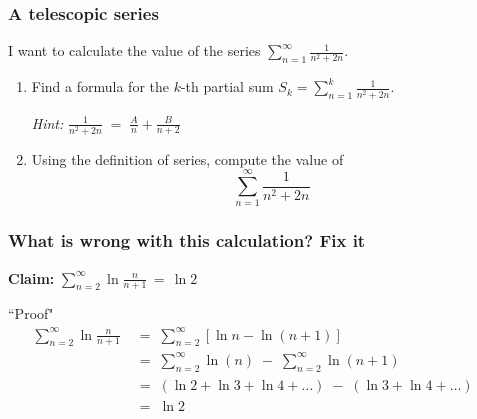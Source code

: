 \documentclass[14pt]{beamer}
\date{}
\title{}
\author{}
\begin{document}





	\begin{frame}[t]
		\fontsize{13}{13}\selectfont
		\frametitle{A telescopic series}
		I want to calculate the value of the series \;
		$\displaystyle \sum_{n=1}^{\infty}\frac{1}{n^{2}+2n}.$
		\vspace{.5cm}
		\begin{enumerate}
			\item Find a formula for the $k$-th partial sum $\displaystyle S_{k}= \sum_{n=1}
				^{k}\frac{1}{n^{2}+2n}.$

				\emph{Hint:} \; $\displaystyle \frac{1}{n^{2}+2n}\; = \; \frac{A}{n}+ \frac{B}{n+2}$
				\vspace{.5cm}

			\item Using the definition of series, compute the value of
				\[
					\sum_{n=1}^{\infty}\frac{1}{n^{2}+2n}
				\]
		\end{enumerate}
	\end{frame}

	\begin{frame}[t]
		\fontsize{13}{13}\selectfont
		\frametitle{What is wrong with this calculation? Fix it}

		{\bfseries Claim:} \; $\displaystyle \sum_{n=2}^{\infty}\ln \frac{n}{n+1}\, =
		\, \ln 2$

		\begin{block}{``Proof"}
			\vspace{-.4cm}
			\begin{align*}
				\sum_{n=2}^{\infty}\ln \frac{n}{n+1}\; & = \; \sum_{n=2}^{\infty}\left[ \ln{n}- \ln(n+1) \right]                                             \\
				\;                                     & = \; \sum_{n=2}^{\infty}\ln (n) \; - \; \sum_{n=2}^{\infty}\ln (n+1)                                \\
				\;                                     & = \; \left( \ln 2 + \ln 3 + \ln 4 + \ldots \right) \; - \; ( \ln 3 + \ln 4 + \ldots) \phantom{\int} \\
				\;                                     & = \; \ln 2
			\end{align*}
		\end{block}
	\end{frame}
\end{document}
